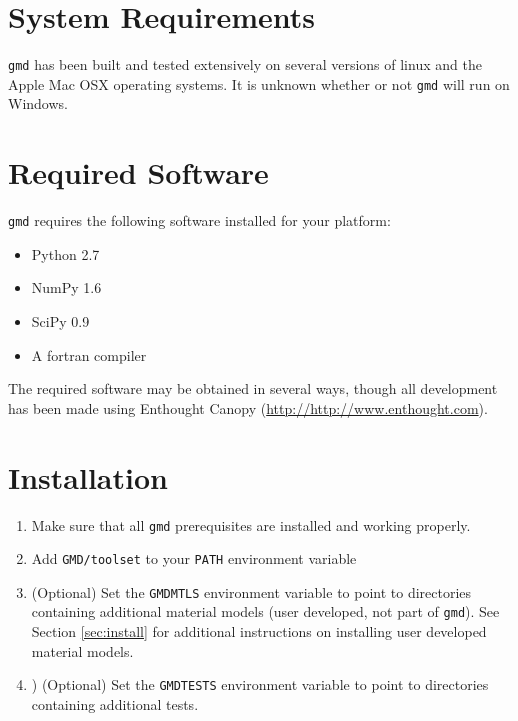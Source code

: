 \documentclass[11pt]{report}
\newcommand{\gmd}{\texttt{gmd}}
\begin{document}
\section{System Requirements}
\gmd{} has been built and tested extensively on several versions of linux and
the Apple Mac OSX operating systems. It is unknown whether or not \gmd{}
will run on Windows.


\section{Required Software}
\gmd{} requires the following software installed for your platform:

\begin{itemize}
  \item Python 2.7
  \item NumPy 1.6
  \item SciPy 0.9
  \item A fortran compiler
\end{itemize}

The required software may be obtained in several ways, though all development
has been made using Enthought Canopy (\url{http://http://www.enthought.com}).

\section{Installation}
\begin{enumerate}
  \item Make sure that all \gmd{} prerequisites are installed and working properly.
  \item Add \verb|GMD/toolset| to your \texttt{PATH} environment variable
  \item (Optional) Set the \texttt{GMDMTLS} environment variable to point to
  directories containing additional material models (user developed, not part
  of \gmd{}). See Section \ref{sec:install} for additional instructions on
  installing user developed material models.
  \item) (Optional) Set the \texttt{GMDTESTS} environment variable to point to
  directories containing additional tests.
\end{enumerate}

\end{document}
